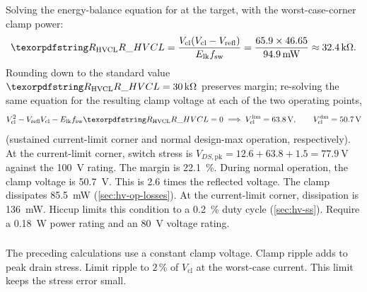 \subsubsection{}

Solving the energy-balance equation for  at the target, with the
worst-case-corner clamp power:
\begin{align*}
  \des{R}{HVCL} = \frac{V_{\mathrm{cl}}(V_{\mathrm{cl}} - V_{\mathrm{refl}})}
    {E_{\mathrm{lk}} f_{\mathrm{sw}}}
    = \frac{65.9 \times 46.65}{\SI{94.9}{\milli\watt}} \approx \SI{32.4}{\kilo\ohm}.
\end{align*}
Rounding down to the standard value $\des{R}{HVCL} = \SI{30}{\kilo\ohm}$
preserves margin; re-solving the same equation for the resulting clamp voltage
at each of the two operating points,
\begin{align*}
  V_{\mathrm{cl}}^2 - V_{\mathrm{refl}} V_{\mathrm{cl}}
    - E_{\mathrm{lk}} f_{\mathrm{sw}} \des{R}{HVCL} = 0
  \;\Longrightarrow\;
  V_{\mathrm{cl}}^{\mathrm{lim}} = \SI{63.8}{\volt}, \qquad
  V_{\mathrm{cl}}^{\mathrm{dm}} = \SI{50.7}{\volt}
\end{align*}
(sustained current-limit corner and normal design-max operation,
respectively). At the current-limit corner, switch stress is
$V_{DS,\mathrm{pk}} = 12.6 + 63.8 + 1.5 = \SI{77.9}{\volt}$ against the
\SI{100}{\volt} rating. The margin is \SI{22.1}{\percent}. During normal
operation, the clamp voltage is \SI{50.7}{\volt}. This is 2.6 times the
reflected voltage. The clamp dissipates \SI{85.5}{\milli\watt}
(\cref{sec:hv-op-losses}). At the current-limit corner, dissipation is
\SI{136}{\milli\watt}. Hiccup limits this condition to a
\SI{0.2}{\percent} duty cycle (\cref{sec:hv-ss}). Require a
\SI{0.18}{\watt} power rating and an \SI{80}{\volt} voltage rating.

\subsubsection{}

The preceding calculations use a constant clamp voltage. Clamp ripple adds to
peak drain stress. Limit ripple to $2\,\%$ of $V_{\mathrm{cl}}$ at the
worst-case current. This limit keeps the stress error small.

